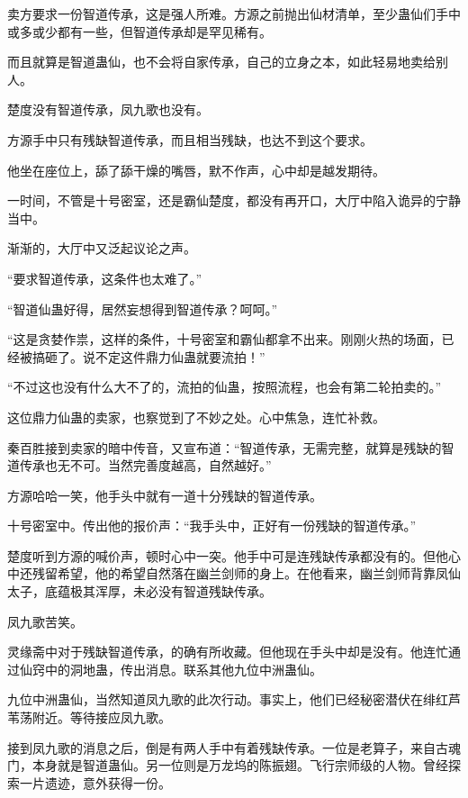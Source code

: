 
\begin{this_body}

卖方要求一份智道传承，这是强人所难。方源之前抛出仙材清单，至少蛊仙们手中或多或少都有一些，但智道传承却是罕见稀有。

而且就算是智道蛊仙，也不会将自家传承，自己的立身之本，如此轻易地卖给别人。

楚度没有智道传承，凤九歌也没有。

方源手中只有残缺智道传承，而且相当残缺，也达不到这个要求。

他坐在座位上，舔了舔干燥的嘴唇，默不作声，心中却是越发期待。

一时间，不管是十号密室，还是霸仙楚度，都没有再开口，大厅中陷入诡异的宁静当中。

渐渐的，大厅中又泛起议论之声。

“要求智道传承，这条件也太难了。”

“智道仙蛊好得，居然妄想得到智道传承？呵呵。”

“这是贪婪作祟，这样的条件，十号密室和霸仙都拿不出来。刚刚火热的场面，已经被搞砸了。说不定这件鼎力仙蛊就要流拍！”

“不过这也没有什么大不了的，流拍的仙蛊，按照流程，也会有第二轮拍卖的。”

这位鼎力仙蛊的卖家，也察觉到了不妙之处。心中焦急，连忙补救。

秦百胜接到卖家的暗中传音，又宣布道：“智道传承，无需完整，就算是残缺的智道传承也无不可。当然完善度越高，自然越好。”

方源哈哈一笑，他手头中就有一道十分残缺的智道传承。

十号密室中。传出他的报价声：“我手头中，正好有一份残缺的智道传承。”

楚度听到方源的喊价声，顿时心中一突。他手中可是连残缺传承都没有的。但他心中还残留希望，他的希望自然落在幽兰剑师的身上。在他看来，幽兰剑师背靠凤仙太子，底蕴极其浑厚，未必没有智道残缺传承。

凤九歌苦笑。

灵缘斋中对于残缺智道传承，的确有所收藏。但他现在手头中却是没有。他连忙通过仙窍中的洞地蛊，传出消息。联系其他九位中洲蛊仙。

九位中洲蛊仙，当然知道凤九歌的此次行动。事实上，他们已经秘密潜伏在绯红芦苇荡附近。等待接应凤九歌。

接到凤九歌的消息之后，倒是有两人手中有着残缺传承。一位是老算子，来自古魂门，本身就是智道蛊仙。另一位则是万龙坞的陈振翅。飞行宗师级的人物。曾经探索一片遗迹，意外获得一份。


\end{this_body}
